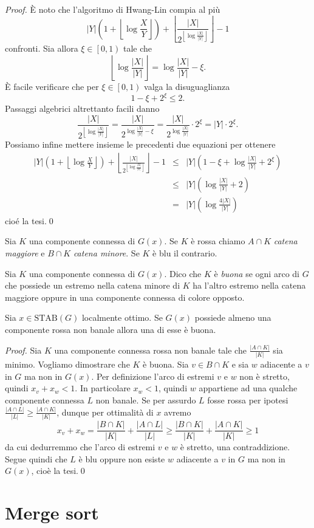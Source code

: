 \begin{proof}
	È noto che l'algoritmo di Hwang-Lin compia al più
	\[|Y|\left(1+\left\lfloor{\log{\frac{X}{Y}}}\right\rfloor\right)+\left\lfloor\frac{|X|}{2^{\left\lfloor\log{\frac{|X|}{|Y|}}\right\rfloor}}\right\rfloor-1\]
	confronti. Sia allora \(\xi\in\left[0,1\right)\) tale che
	\[\left\lfloor\log{\frac{|X|}{|Y|}}\right\rfloor=\log{\frac{|X|}{|Y|}}-\xi.\]
	È facile verificare che per \(\xi\in\left[0,1\right)\) valga la disuguaglianza
	\[ 1-\xi+2^{\xi}\le 2. \]
	Passaggi algebrici altrettanto facili danno
	\[ \frac{|X|}{2^{\left\lfloor\log{\frac{|X|}{|Y|}}\right\rfloor}}=\frac{|X|}{2^{\log{\frac{|X|}{|Y|}}-\xi}}=\frac{|X|}{2^{\log{\frac{|X|}{|Y|}}}}\cdot 2^{\xi}=|Y|\cdot 2^{\xi}. \]
	Possiamo infine mettere insieme le precedenti due equazioni per ottenere 
	\begin{eqnarray}
		|Y|\left(1+\left\lfloor{\log{\frac{X}{Y}}}\right\rfloor\right)+\left\lfloor\frac{|X|}{2^{\left\lfloor\log{\frac{|X|}{|Y|}}\right\rfloor}}\right\rfloor-1&\le&|Y|\left(1-\xi+\log{\frac{|X|}{|Y|}}+2^{\xi}\right) \nonumber \\
		&\le& |Y|\left(\log{\frac{|X|}{|Y|}}+2\right) \nonumber \\
		&=& |Y|\left(\log{\frac{4|X|}{|Y|}}\right) \nonumber 
	\end{eqnarray}
	cioé la tesi.\qed
\end{proof}
\begin{definition}
	Sia \(K\) una componente connessa di \(G(x)\). Se \(K\) è rossa chiamo \(A\cap K\) \emph{catena maggiore} e \(B\cap K\) \emph{catena minore}. Se \(K\) è blu il contrario. 
\end{definition}
\begin{definition}
	Sia \(K\) una componente connessa di \(G(x)\). Dico che \(K\) è \emph{buona} se ogni arco di \(G\) che possiede un estremo nella catena minore di \(K\) ha l'altro estremo nella catena maggiore oppure in una componente connessa di colore opposto. 
\end{definition}
\begin{lemma}
	Sia \(x\in \text{STAB}(G)\) localmente ottimo. Se \(G(x)\) possiede almeno una componente rossa non banale allora una di esse è buona. 
\end{lemma}
\begin{proof}
	Sia \(K\) una componente connessa rossa non banale tale che \(\frac{|A\cap K|}{|K|}\) sia minimo. Vogliamo dimostrare che \(K\) è buona. Sia \(v\in B\cap K\) e sia \(w\) adiacente a \(v\) in \(G\) ma non in \(G(x)\). Per definizione l'arco di estremi \(v\) e \(w\) non è stretto, quindi \(x_v+x_w<1\). In particolare \(x_w<1\), quindi \(w\) appartiene ad una qualche componente connessa \(L\) non banale. Se per assurdo \(L\) fosse rossa per ipotesi \(\frac{|A\cap L|}{|L|}\ge\frac{|A\cap K|}{|K|}\), dunque per ottimalità di \(x\) avremo
	\[x_v+x_w=\frac{|B\cap K|}{|K|}+\frac{|A\cap L|}{|L|}\ge\frac{|B\cap K|}{|K|}+\frac{|A\cap K|}{|K|}\ge 1\]
	da cui dedurremmo che l'arco di estremi \(v\) e \(w\) è stretto, una contraddizione. Segue quindi che \(L\) è blu oppure non esiste \(w\) adiacente a \(v\) in \(G\) ma non in \(G(x)\), cioè la tesi.\qed
\end{proof}

\section{Merge sort} 
